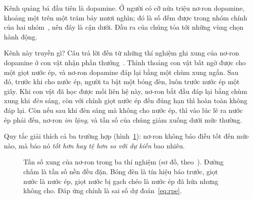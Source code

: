 Kênh quảng bá đầu tiên là dopamine. Ở người có cỡ nửa triệu nơ-ron dopamine, khoảng một trên một trăm bảy mươi nghìn; đó là số đếm được trong nhóm chính của hai nhóm~\cite{Pakkenberg1991}, nên đây là cận dưới. Đầu ra của chúng tỏa tới những vùng chọn hành động.

Kênh này truyền gì? Câu trả lời đến từ những thí nghiệm ghi xung của nơ-ron dopamine ở con vật nhận phần thưởng~\cite{Schultz1997}. Thỉnh thoảng con vật bất ngờ được cho một giọt nước ép, và nơ-ron dopamine đáp lại bằng một chùm xung ngắn. Sau đó, trước khi cho nước ép, người ta bật một bóng đèn, luôn trước nước ép một giây. Khi con vật đã học được mối liên hệ này, nơ-ron bắt đầu đáp lại bằng chùm xung khi \emph{đèn} sáng, còn với chính giọt nước ép đến đúng hạn thì hoàn toàn không đáp lại. Còn nếu sau khi đèn sáng mà không cho nước ép, thì vào lúc lẽ ra nước ép phải đến, nơ-ron \emph{im lặng}, và tần số của chúng giảm xuống dưới mức thường.

Quy tắc giải thích cả ba trường hợp (hình~\ref{fig:rpe}): nơ-ron không báo điều tốt đến mức nào, mà báo nó \emph{tốt hơn hay tệ hơn so với dự kiến} bao nhiêu.

\begin{figure}[t]
\centering
{}
\caption{Tần số xung của nơ-ron  trong ba thí nghiệm (sơ đồ, theo~\cite{Schultz1997}). Đường chấm là tần số nền đều đặn. Bóng đèn là tín hiệu báo trước, giọt nước là nước ép, giọt nước bị gạch chéo là nước ép đã hứa nhưng không cho. Đáp ứng chính là sai số dự đoán~\eqref{eq:rpe}.}
\label{fig:rpe}
\end{figure}

